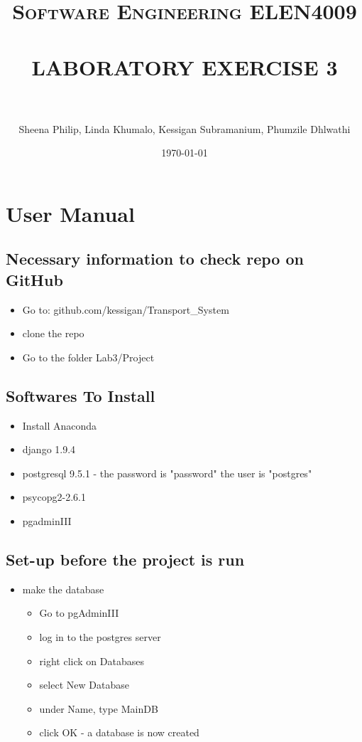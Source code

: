 \documentclass[paper=a4, fontsize=11pt]{scrartcl} %
\title{	
\normalfont \normalsize 
\textsc{Software Engineering ELEN4009} \\ [25pt] %
\horrule{0.5pt} \\[0.4cm] %
\huge LABORATORY EXERCISE 3 \\ %
\horrule{2pt} \\[0.5cm] %
}
\author{ Sheena Philip, Linda Khumalo, Kessigan Subramanium, Phumzile Dhlwathi} %
\date{\normalsize\today} %
\numberwithin{equation}{section} %
\numberwithin{figure}{section} %
\numberwithin{table}{section} %
\begin{document}
\maketitle %


\section{User Manual}

\subsection{Necessary information to check repo on GitHub}
\begin{itemize}
\item Go to: github.com/kessigan/Transport\_System
\item clone the repo
\item Go to the folder Lab3/Project
\end{itemize}

\subsection{Softwares To Install}
\begin{itemize}
\item  Install Anaconda
\item django 1.9.4
\item postgresql 9.5.1 - the password is "password" the user is "postgres"
\item psycopg2-2.6.1
\item pgadminIII

\end{itemize}

\subsection{Set-up before the project is run}
\begin{itemize}
\item make the database
\begin{itemize}
\item Go to pgAdminIII
\item log in to the postgres server
\item right click on Databases
\item select New Database
\item under Name, type MainDB
\item click OK - a database is now created

\end{itemize}
\end{itemize}
\end{document}
